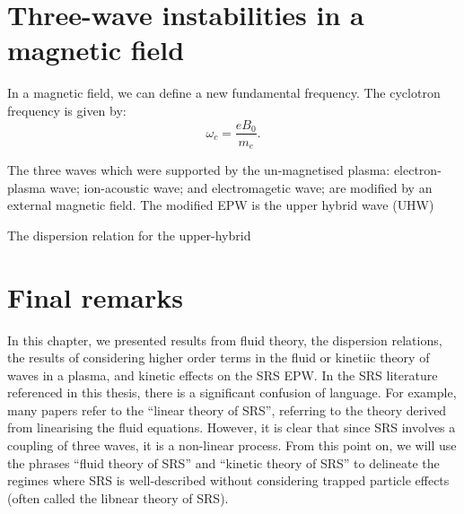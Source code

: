 
\section{Three-wave instabilities in a magnetic field}

In a magnetic field, we can define a new fundamental frequency. The cyclotron frequency is given by:
\begin{equation}
\omega_c = \frac{eB_0}{m_e}.
\end{equation}

The three waves which were supported by the un-magnetised plasma: electron-plasma wave; ion-acoustic wave; and electromagetic wave; are modified by an external magnetic field. The modified \acrshort{EPW} is the upper hybrid wave (\acrshort{UHW})

The dispersion relation for the upper-hybrid 

\section{Final remarks}
In this chapter, we presented results from fluid theory, the dispersion relations, the results of considering higher order terms in the fluid or kinetiic theory of waves in a plasma, and kinetic effects on the SRS EPW. In the SRS literature referenced in this thesis, there is a significant confusion of language. For example, many papers refer to the ``linear theory of SRS'', referring to the theory derived from linearising the fluid equations. However, it is clear that since SRS involves a coupling of three waves, it is a non-linear process. From this point on, we will use the phrases ``fluid theory of SRS'' and ``kinetic theory of SRS'' to delineate the regimes where SRS is well-described without considering trapped particle effects (often called the libnear theory of SRS).

%
%
